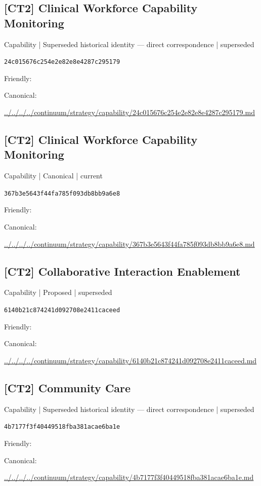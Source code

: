 \documentclass[10pt,a4paper]{article}
\begin{document}
\subsection*{[CT2] Clinical Workforce Capability Monitoring}
{\small Capability | Superseded historical identity — direct correspondence | superseded}\par
\texttt{24c015676c254e2e82e8e4287c295179}\par
Friendly: \par
Canonical: \par
{\footnotesize\url{../../../../continuum/strategy/capability/24c015676c254e2e82e8e4287c295179.md}}\par
\subsection*{[CT2] Clinical Workforce Capability Monitoring}
{\small Capability | Canonical | current}\par
\texttt{367b3e5643f44fa785f093db8bb9a6e8}\par
Friendly: \par
Canonical: \par
{\footnotesize\url{../../../../continuum/strategy/capability/367b3e5643f44fa785f093db8bb9a6e8.md}}\par
\subsection*{[CT2] Collaborative Interaction Enablement}
{\small Capability | Proposed | superseded}\par
\texttt{6140b21c874241d092708e2411caceed}\par
Friendly: \par
Canonical: \par
{\footnotesize\url{../../../../continuum/strategy/capability/6140b21c874241d092708e2411caceed.md}}\par
\subsection*{[CT2] Community Care}
{\small Capability | Superseded historical identity — direct correspondence | superseded}\par
\texttt{4b7177f3f40449518fba381acae6ba1e}\par
Friendly: \par
Canonical: \par
{\footnotesize\url{../../../../continuum/strategy/capability/4b7177f3f40449518fba381acae6ba1e.md}}\par
\end{document}
